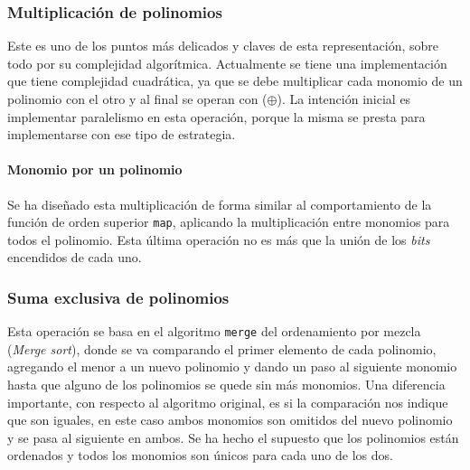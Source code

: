 \subsubsection{Multiplicación de polinomios}

Este es uno de los puntos más delicados y claves de esta representación, sobre todo por su complejidad algorítmica. Actualmente se tiene una implementación que tiene complejidad cuadrática, ya que se debe multiplicar cada monomio de un polinomio con el otro y al final se operan con ($\oplus$). La intención inicial es implementar paralelismo en esta operación, porque la misma se presta para implementarse con ese tipo de estrategia.

\paragraph{Monomio por un polinomio}
\label{sec:map}

Se ha diseñado esta multiplicación de forma similar al comportamiento de la función de orden superior \texttt{map}, aplicando la multiplicación entre monomios para todos el polinomio. Esta última operación no es más que la unión de los \textit{bits} encendidos de cada uno.

\subsubsection{Suma exclusiva de polinomios}

Esta operación se basa en el algoritmo \texttt{merge} del ordenamiento por mezcla (\textit{Merge sort}), donde se va comparando el primer elemento de cada polinomio, agregando el menor a un nuevo polinomio y dando un paso al siguiente monomio hasta que alguno de los polinomios se quede sin más monomios. Una diferencia importante, con respecto al algoritmo original, es si la comparación nos indique que son iguales, en este caso ambos monomios son omitidos del nuevo polinomio y se pasa al siguiente en ambos. Se ha hecho el supuesto que los polinomios están ordenados y todos los monomios son únicos para cada uno de los dos.
